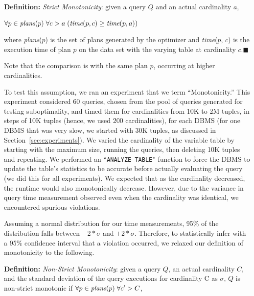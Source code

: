 \documentclass[prodmode,acmtods]{acmsmall}
\begin{document}
\vspace{1em}\noindent
{\bf Definition:} {\em Strict Monotonicity}: given a query $Q$ and an actual
cardinality $a$,

\quad\quad\quad\quad\quad$\forall p \in \hbox{\em plans} (p) \;\forall c > a \;( \hbox{\em time} (p,
c) \geq \hbox{\em time} (p,a) )$

\vspace{1em}\noindent
where {\em plans}($p$) is the set of plans generated by the optimizer and
{\em time}($p$, $c$) is the execution time of plan $p$ on the data set with
the varying table at cardinality $c$.\hfill$\blacksquare$

\vspace{1em}
\noindent
Note that the comparison is with the same plan $p$, occurring at higher
cardinalities.

To test this assumption, we ran an experiment that we term
``Monotonicity.'' This experiment considered 60 queries, chosen from the
pool of queries
generated for testing suboptimality, and timed them for cardinalities from 10K
to 2M tuples, in steps of 10K tuples (hence, we used 200 cardinalities), for
each \hbox{DBMS} (for one \hbox{DBMS} that was very slow, we started with 30K tuples, as
discussed in Section~\ref{sec:experiments}). We varied the cardinality of the variable table by starting with
the maximum size, running the queries, then deleting 10K tuples and repeating.
We performed an ``{\tt ANALYZE TABLE}'' function to force
the \hbox{DBMS} to update the table's statistics to be accurate before actually
evaluating the query (we did this for all experiments).
We expected that as the cardinality decreased,
the runtime would also monotonically decrease. However, due to the variance in query
time measurement observed even when the cardinality was identical, we encountered
spurious violations.

Assuming a normal distribution for our time measurements, 95\% of 
the distribution falls between $-2*\sigma$ and $+2*\sigma$. 
Therefore, to statistically
infer with a 95\% confidence interval that a violation occurred, 
we relaxed our definition of monotonicity to the following.

\vspace{1em}\noindent
{\bf Definition:} {\em Non-Strict Monotonicity}: given a query $Q$, an actual
cardinality $C$, and the standard deviation of the query executions for
cardinality C as $\sigma$, $Q$ is non-strict monotonic if $\forall p \in
\hbox{\em plans} (p) \;\forall c^{\prime} > C $,
\end{document}
